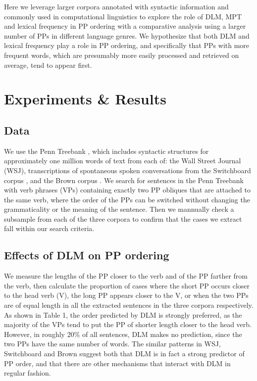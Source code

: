 \documentclass[11pt,letterpaper]{article}
\begin{document}
Here we leverage larger corpora annotated with syntactic information and commonly used in computational linguistics to explore the role of DLM, MPT and lexical frequency in PP ordering with a comparative analysis using a larger number of PPs in different language genres. We hypothesize that both DLM and lexical frequency play a role in PP ordering, and specifically that PPs with more frequent words, which are presumably more easily processed and retrieved on average, tend to appear first. 

\section{Experiments \& Results}

\subsection{Data}

We use the Penn Treebank \cite{Marcus:1993}, which includes syntactic structures for approximately one million words of text from each of: the Wall Street Journal (WSJ), transcriptions of spontaneous spoken conversations from the Switchboard corpus \cite{Godfrey:1992}, and the Brown corpus \cite{Kuvcera:1967}. We search for sentences in the Penn Treebank with verb phrases (VPs) containing exactly two PP obliques that are attached to the same verb, where the order of the PPs can be switched without changing the grammaticality or the meaning of the sentence. Then we mannually check a subsample from each of the three corpora to confirm that the cases we extract fall within our search criteria.

\subsection{Effects of DLM on PP ordering}

We measure the lengths of the PP closer to the verb and of the PP farther from the verb, then calculate the proportion of cases where the short PP occurs closer to the head verb (V), the long PP appears closer to the V, or when the two PPs are of equal length in all the extracted sentences in the three corpora respectively. As shown in Table 1, the order predicted by DLM is strongly preferred, as the majority of the VPs tend to put the PP of shorter length closer to the head verb. However, in roughly 20\% of all sentences, DLM makes no prediction, since the two PPs have the same number of words. The similar patterns in WSJ, Switchboard and Brown suggest both that DLM is in fact a strong predictor of PP order, and that there are other mechanisms that interact with DLM in regular fashion. 
\end{document}
